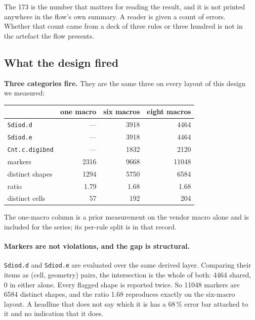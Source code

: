 \documentclass[11pt,a4paper]{article}
\begin{document}
The \num{173} is the number that matters for reading the result, and it
is not printed anywhere in the flow's own summary. A reader is given a
count of errors. Whether that count came from a deck of three rules or
three hundred is not in the artefact the flow presents.

\subsection{What the design fired}

\textbf{Three categories fire.} They are the same three on every layout
of this design we measured:

\begin{center}
\begin{tabular}{lrrr}
\toprule
& one macro & six macros & eight macros \\
\midrule
\texttt{Sdiod.d}       & --- & \num{3918} & \num{4464} \\
\texttt{Sdiod.e}       & --- & \num{3918} & \num{4464} \\
\texttt{Cnt.c.digibnd} & --- & \num{1832} & \num{2120} \\
\midrule
markers                & \num{2316} & \num{9668} & \num{11048} \\
distinct shapes        & \num{1294} & \num{5750} & \num{6584} \\
ratio                  & \num{1.79} & \num{1.68} & \num{1.68} \\
distinct cells         & \num{57}   & \num{192}  & \num{204} \\
\bottomrule
\end{tabular}
\end{center}

The one-macro column is a prior measurement on the vendor macro alone and
is included for the series; its per-rule split is in that record.

\paragraph{Markers are not violations, and the gap is structural.}
\texttt{Sdiod.d} and \texttt{Sdiod.e} are evaluated over the same derived
layer. Comparing their items as (cell, geometry) pairs, the intersection
is the whole of both: \num{4464} shared, \num{0} in either alone. Every
flagged shape is reported twice. So \num{11048} markers are \num{6584}
distinct shapes, and the ratio \num{1.68} reproduces exactly on the
six-macro layout. A headline that does not say which it is has a
\num{68}\,\% error bar attached to it and no indication that it does.
\end{document}
